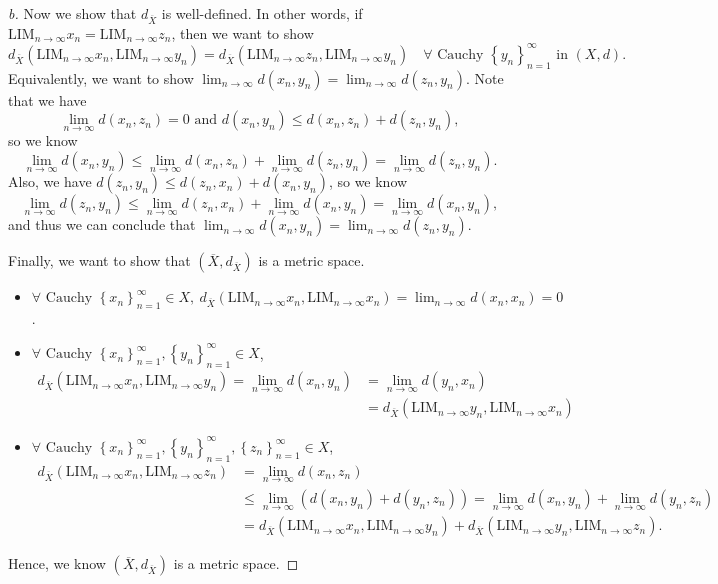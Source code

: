 \begin{proof}[b]
  Now we show that \(d_{\overline{X} }\) is well-defined. In other words, if \(\mathrm{LIM}_{n \to \infty } x_n = \mathrm{LIM}_{n \to \infty } z_n \), then we want to show
  \[
    d_{\overline{X} }\left( \mathrm{LIM}_{n \to \infty }x_n, \mathrm{LIM}_{n \to \infty }y_n   \right) = d_{\overline{X} } \left( \mathrm{LIM}_{n \to \infty }z_n, \mathrm{LIM}_{n \to \infty } y_n  \right) \quad \forall \text{ Cauchy } \left\{ y_n \right\}_{n=1}^{\infty} \text{ in } (X, d).   
  \]  Equivalently, we want to show \(\lim_{n \to \infty} d(x_n, y_n) = \lim_{n \to \infty} d(z_n, y_n) \). Note that we have 
  \[
     \lim_{n \to \infty} d(x_n, z_n) = 0 \text{ and } d(x_n, y_n) \le d(x_n, z_n) + d(z_n, y_n),
  \] so we know
  \[
    \lim_{n \to \infty} d(x_n, y_n) \le \lim_{n \to \infty} d(x_n, z_n) + \lim_{n \to \infty} d(z_n, y_n) = \lim_{n \to \infty} d(z_n, y_n).  
  \]
  Also, we have \(d(z_n, y_n) \le d(z_n, x_n) + d(x_n, y_n)\), so we know 
  \[
  \lim_{n \to \infty} d(z_n, y_n) \le \lim_{n \to \infty} d(z_n, x_n) + \lim_{n \to \infty} d(x_n, y_n) = \lim_{n \to \infty} d(x_n, y_n),
  \] and thus we can conclude that \(\lim_{n \to \infty} d(x_n, y_n) = \lim_{n \to \infty} d(z_n, y_n)  \). 
  
  Finally, we want to show that \(\left( \overline{X}, d_{\overline{X} }  \right) \) is a metric space. 
  \begin{itemize}
    \item \(\forall \text{ Cauchy } \left\{ x_n \right\}_{n=1}^{\infty} \in X, \ d_{\overline{X} } (\mathrm{LIM}_{n \to \infty } x_n, \mathrm{LIM}_{n\to \infty } x_n  ) = \lim_{n \to \infty} d(x_n, x_n) = 0  \). 
    \item \(\forall \text{ Cauchy } \left\{ x_n \right\}_{n=1}^{\infty} , \left\{ y_n \right\}_{n=1}^{\infty} \in X  \), 
    \begin{align*}
      d_{\overline{X} }(\mathrm{LIM}_{n \to \infty }x_n, \mathrm{LIM}_{n \to \infty }y_n  ) = \lim_{n \to \infty} d(x_n, y_n)  &= \lim_{n \to \infty} d(y_n, x_n) \\ &= d_{\overline{X}} (\mathrm{LIM}_{n \to \infty } y_n, \mathrm{LIM}_{n \to \infty } x_n  )   
    \end{align*}
    \item \(\forall \text{ Cauchy } \left\{ x_n \right\}_{n=1}^{\infty} , \left\{ y_n \right\}_{n=1}^{\infty}, \left\{ z_n \right\}_{n=1}^{\infty}   \in X  \), \begin{align*}
      d_{\overline{X} }(\mathrm{LIM}_{n \to \infty }x_n, \mathrm{LIM}_{n \to \infty }z_n  ) &= \lim_{n \to \infty} d(x_n, z_n) \\
      &\le \lim_{n \to \infty} (d(x_n, y_n) + d(y_n, z_n)) = \lim_{n \to \infty} d(x_n, y_n) + \lim_{n \to \infty} d(y_n, z_n) \\
      &= d_{\overline{X} } (\mathrm{LIM}_{n \to \infty }x_n, \mathrm{LIM}_{n \to \infty }y_n ) + d_{\overline{X} } (\mathrm{LIM}_{n \to \infty }y_n, \mathrm{LIM}_{n \to \infty }z_n ). 
    \end{align*}
  \end{itemize}
  Hence, we know \(\left( \overline{X}, d_{\overline{X} }  \right) \) is a metric space. 
\end{proof}
